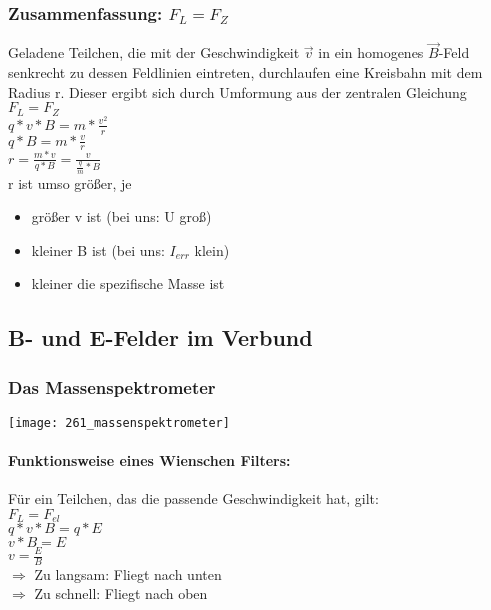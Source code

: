 \subsubsection{Zusammenfassung: $F_L = F_Z$}
Geladene Teilchen, die mit der Geschwindigkeit $\vec{v}$ in ein homogenes $\vec{B}$-Feld senkrecht zu dessen Feldlinien eintreten, durchlaufen eine Kreisbahn mit dem Radius r. Dieser ergibt sich durch Umformung aus der zentralen Gleichung 
$F_L = F_Z$
\vspace{1mm} \\
$ q \ast v \ast B = m \ast \frac{v^2}{r} $
\vspace{1mm} \\
$ q \ast B = m \ast \frac{v}{r} $
\vspace{1mm} \\
$ r = \frac{m \ast v}{q \ast B} = \frac{v}{\frac{q}{m} \ast B} $
\vspace{5mm} \\
r ist umso größer, je
\begin{itemize}
	\item größer v ist (bei uns: U groß)
	\item kleiner B ist (bei uns: $I_{err}$ klein)
	\item kleiner die spezifische Masse ist
\end{itemize}

\subsection{B- und E-Felder im Verbund}
\subsubsection{Das Massenspektrometer}
\texttt{[image: 261\_massenspektrometer]}
\newpage
\paragraph{Funktionsweise eines Wienschen Filters:} Für ein Teilchen, das die passende Geschwindigkeit hat, gilt: 
\vspace{2mm} \\
$ F_L = F_{el} $
\vspace{1mm} \\
$ q\ast v \ast B = q \ast E $
\vspace{1mm} \\
$ v \ast B = E $
\vspace{1mm} \\
$ v = \frac{E}{B} $
\vspace{5mm} \\
$ \Rightarrow $ Zu langsam: Fliegt nach unten
\vspace{1mm} \\
$ \Rightarrow $ Zu schnell: Fliegt nach oben

